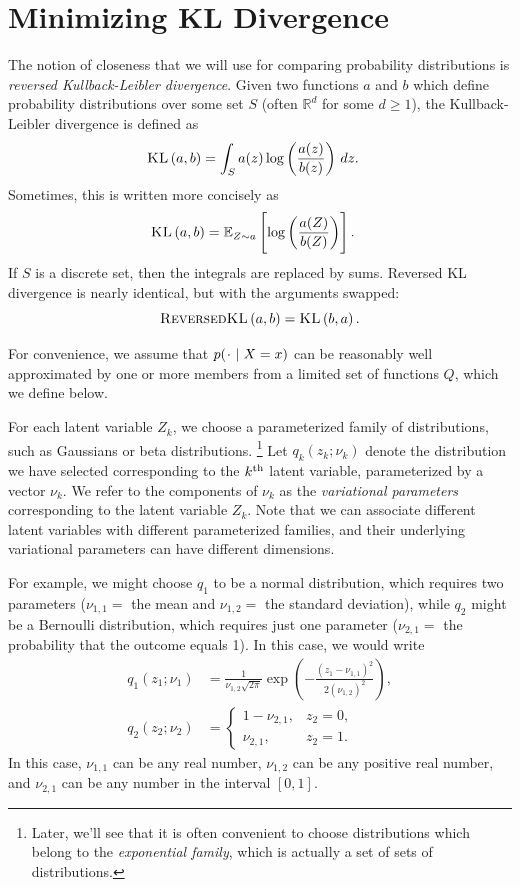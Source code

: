 \documentclass[11pt]{article}
\newcommand{\KL}[2]{\textsc{KL}\left( {#1} , {#2} \right)}
\newcommand{\rKL}[2]{\textsc{ReversedKL}\left( {#1} , {#2} \right)}
\newcommand*{\placeholder}{\makebox[1ex]{$\cdot$}}
\begin{document}
\section{Minimizing KL Divergence}

The notion of closeness that we will use for comparing probability distributions is \emph{reversed Kullback-Leibler divergence}.
Given two functions $a$ and $b$ which define probability distributions over some set $S$ (often $\mathbb R^d$ for some $d \geq 1$), the Kullback-Leibler divergence is defined as
\begin{align}
\KL{a}{b}
&= \int_S a(z) \log \left( \frac{a(z)}{b(z)} \right) \, dz.
\end{align}
Sometimes, this is written more concisely as
\begin{align}
\KL{a}{b}
&= \expectOver{Z \sim a}{ \log \left( \frac{a(Z)}{b(Z)} \right) }.
\end{align}
If $S$ is a discrete set, then the integrals are replaced by sums.
Reversed KL divergence is nearly identical, but with the arguments swapped:
\[ \rKL{a}{b} = \KL{b}{a}. \]

For convenience, we assume that $p(\placeholder \mid X = x)$ can be reasonably well approximated by one or more members from a limited set of functions $Q$, which we define below.

For each latent variable $Z_k$, we choose a parameterized family of distributions, such as Gaussians or beta distributions.%
\footnote{Later, we'll see that it is often convenient to choose distributions which belong to the \emph{exponential family}, which is actually a set of sets of distributions.}
Let $q_k(z_k; \nu_k)$ denote the distribution we have selected corresponding to the $k^{\mathrm{th}}$ latent variable, parameterized by a vector $\nu_k$.
We refer to the components of $\nu_k$ as the \emph{variational parameters} corresponding to the latent variable $Z_k$.
Note that we can associate different latent variables with different parameterized families, and their underlying variational parameters can have different dimensions.

For example, we might choose $q_1$ to be a normal distribution, which requires two parameters ($\nu_{1,1} =$ the mean and $\nu_{1,2} =$ the standard deviation), while $q_2$ might be a Bernoulli distribution, which requires just one parameter ($\nu_{2,1} =$ the probability that the outcome equals 1).
In this case, we would write
\begin{align}
q_1(z_1; \nu_1) &= \frac{1}{\nu_{1,2} \sqrt{2 \pi}} \exp\left( -\frac{(z_1 - \nu_{1,1})^2}{2 (\nu_{1,2})^2} \right), \\
q_2(z_2; \nu_2) &=
    \begin{cases}
    1-\nu_{2,1}, & z_2 = 0, \\
    \nu_{2,1},   & z_2 = 1.
    \end{cases}
\end{align}
In this case, $\nu_{1,1}$ can be any real number, $\nu_{1,2}$ can be any positive real number, and $\nu_{2,1}$ can be any number in the interval $[0,1]$.
\end{document}
